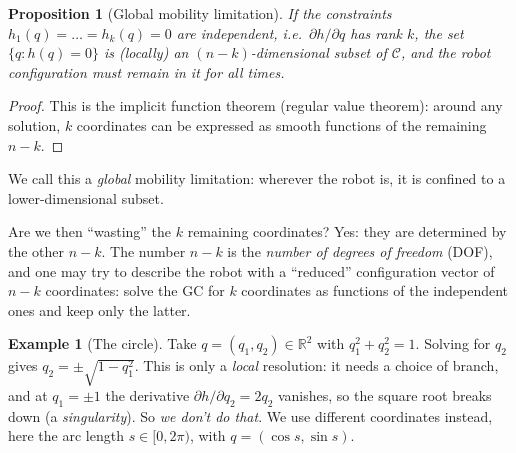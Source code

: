 \documentclass[11pt,a4paper]{article}
\theoremstyle{definition}
\newtheorem{example}[definition]{Example}
\theoremstyle{plain}
\newtheorem{proposition}[definition]{Proposition}
\begin{document}
\begin{proposition}[Global mobility limitation]\label{prop:global}
If the constraints $h_1(q)=\dots=h_k(q)=0$ are independent, i.e.\ $\partial h/\partial q$ has rank $k$, the set $\{q: h(q)=0\}$ is (locally) an $(n-k)$-dimensional subset of $\mathcal C$, and the robot configuration must remain in it for all times.
\end{proposition}
\begin{proof}
This is the implicit function theorem (regular value theorem): around any solution, $k$ coordinates can be expressed as smooth functions of the remaining $n-k$.
\end{proof}
 
We call this a \emph{global} mobility limitation: wherever the robot is, it is confined to a lower-dimensional subset.
 
\begin{intuition}
Are we then ``wasting'' the $k$ remaining coordinates? Yes: they are determined by the other $n-k$. The number $n-k$ is the \emph{number of degrees of freedom} (DOF), and one may try to describe the robot with a ``reduced'' configuration vector of $n-k$ coordinates: solve the GC for $k$ coordinates as functions of the independent ones and keep only the latter.
\end{intuition}
 
\begin{example}[The circle]\label{ex:circle}
Take $q=(q_1,q_2)\in\mathbb R^2$ with $q_1^2+q_2^2=1$. Solving for $q_2$ gives $q_2=\pm\sqrt{1-q_1^2}$. This is only a \emph{local} resolution: it needs a choice of branch, and at $q_1=\pm1$ the derivative $\partial h/\partial q_2=2q_2$ vanishes, so the square root breaks down (a \emph{singularity}). So \emph{we don't do that}. We use different coordinates instead, here the arc length $s\in[0,2\pi)$, with $q=(\cos s,\sin s)$.
\end{example}
 
\end{document}
